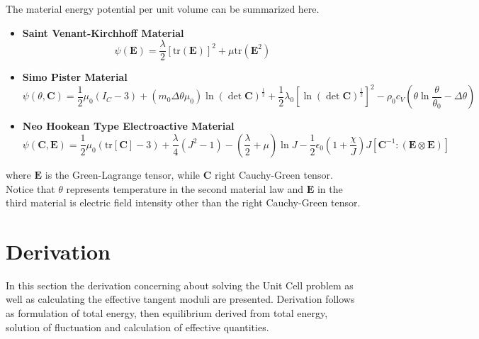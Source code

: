 The material energy potential per unit volume can be summarized here.
\begin{itemize}
	\item[] \textbf{Saint Venant-Kirchhoff Material}
	\begin{equation}
	\label{eq: svk}
	\psi\left( \mathbf{E} \right) = \dfrac{\lambda}{2} \left[ \text{tr}(\mathbf{E}) \right]^{2} + \mu \text{tr} \left( \mathbf{E}^{2} \right)
	\end{equation}
	\item[] \textbf{Simo Pister Material}
	\begin{equation}
	\label{eq: sp mat}
	\psi\left( \theta, \mathbf{C} \right) = \frac{1}{2}\mu_{0} \left( I_{C}-3 \right) + \left( m_{0}\Delta \theta \mu_{0}\right) \ln (\det \mathbf{C})^{\frac{1}{2}} + \frac{1}{2} \lambda_{0} \left[ \ln \left( \det \mathbf{C} \right)^{\frac{1}{2}} \right]^{2} - \rho_{0} c_{V} \left( \theta \ln\dfrac{\theta}{\theta_{0}} - \Delta \theta \right)
	\end{equation}
	\item[] \textbf{Neo Hookean Type Electroactive Material}
	\begin{equation}
	\label{eq: nhk}
	\psi\left( \mathbf{C}, \mathbf{E} \right) =  \frac{1}{2}\mu_{0} \left( \text{tr}[\mathbf{C}]-3 \right) + \dfrac{\lambda}{4} \left( J^{2}-1 \right) - \left( \dfrac{\lambda}{2} + \mu \right) \ln J - \frac{1}{2} \epsilon_{0} \left( 1+\dfrac{\chi}{J} \right) J \left[ \mathbf{C}^{-1}: (\mathbf{E} \otimes \mathbf{E}) \right]
	\end{equation}
\end{itemize}
where $\mathbf{E}$ is the Green-Lagrange tensor, while $\mathbf{C}$ right Cauchy-Green tensor. Notice that $\theta$ represents temperature in the second material law and $\mathbf{E}$ in the third material is electric field intensity other than the right Cauchy-Green tensor.

\section{Derivation}
In this section the derivation concerning about solving the Unit Cell problem as well as calculating the effective tangent moduli are presented. Derivation follows as formulation of total energy, then equilibrium derived from total energy, solution of fluctuation and calculation of effective quantities.

